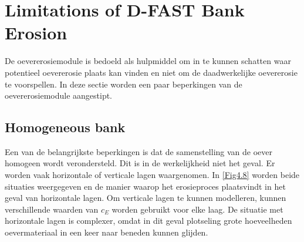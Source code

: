 \section{Limitations of D-FAST Bank Erosion} \label{Sec4.7}

De oevererosiemodule is bedoeld als hulpmiddel om in te kunnen schatten waar potentieel oevererosie plaats kan vinden en niet om de daadwerkelijke oevererosie te voorspellen.
In deze sectie worden een paar beperkingen van de oevererosiemodule aangestipt.

\subsection{Homogeneous bank}

Een van de belangrijkste beperkingen is dat de samenstelling van de oever homogeen wordt verondersteld.
Dit is in de werkelijkheid niet het geval.
Er worden vaak horizontale of verticale lagen waargenomen.
In \autoref{Fig4.8} worden beide situaties weergegeven en de manier waarop het erosieproces plaatsvindt in het geval van horizontale lagen.
Om verticale lagen te kunnen modelleren, kunnen verschillende waarden van $c_E$ worden gebruikt voor elke laag.
De situatie met horizontale lagen is complexer, omdat in dit geval plotseling grote hoeveelheden oevermateriaal in een keer naar beneden kunnen glijden.

